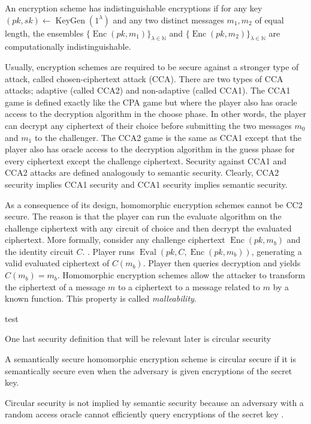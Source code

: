 \begin{definition}
    An encryption scheme has indistinguishable encryptions if for any key $(pk,sk) \leftarrow \operatorname{KeyGen}(1^{\lambda})$ and any two distinct messages $m_1, m_2$ of equal length, the ensembles $\{\operatorname{Enc}(pk,m_1)\}_{\lambda \in \mathbb{N}}$ and $\{\operatorname{Enc}(pk,m_2)\}_{\lambda \in \mathbb{N}}$ are computationally indistinguishable.
\end{definition}

Usually, encryption schemes are required to be secure against a stronger type of attack, called chosen-ciphertext attack (CCA). There are two types of CCA attacks; adaptive (called CCA2) and non-adaptive (called CCA1). The CCA1 game is defined exactly like the CPA game but where the player also has oracle access to the decryption algorithm in the choose phase. In other words, the player can decrypt any ciphertext of their choice before submitting the two messages $m_0$ and $m_1$ to the challenger. The CCA2 game is the same as CCA1 except that the player also has oracle access to the decryption algorithm in the guess phase for every ciphertext except the challenge ciphertext. Security against CCA1 and CCA2 attacks are defined analogously to semantic security. Clearly, CCA2 security implies CCA1 security and CCA1 security implies semantic security.

As a consequence of its design, homomorphic encryption schemes cannot be CC2 secure. The reason is that the player can run the evaluate algorithm on the challenge ciphertext with any circuit of choice and then decrypt the evaluated ciphertext. More formally, consider any challenge ciphertext $\operatorname{Enc}(pk,m_b)$ and the identity circuit $C$. . Player runs $\operatorname{Eval}(pk,C,\operatorname{Enc}(pk,m_b))$, generating a valid evaluated ciphertext of $C(m_b)$. Player then queries decryption and yields $C(m_b) = m_b$. Homomorphic encryption schemes allow the attacker to transform the ciphertext of a message $m$ to a ciphertext to a message related to $m$ by a known function. This property is called \emph{malleability}.

\begin{definition}
    test
\end{definition}


One last security definition that will be relevant later is circular security
\begin{definition}
    A semantically secure homomorphic encryption scheme is circular secure if it is semantically secure even when the adversary is given encryptions of the secret key.
\end{definition}
\begin{remark}
    Circular security is not implied by semantic security because an adversary with a random access oracle cannot efficiently query encryptions of the secret key \cite{Bra18-survey}.
\end{remark}


